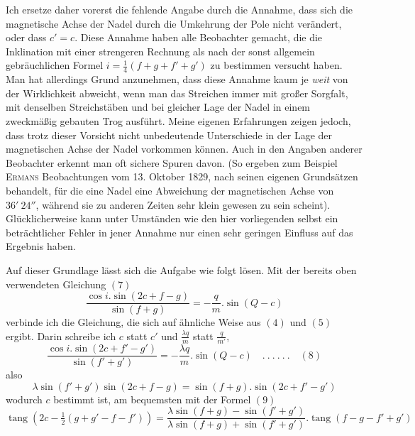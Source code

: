 Ich ersetze daher vorerst die fehlende Angabe durch die Annahme, dass sich die magnetische Achse der Nadel durch die Umkehrung der Pole nicht verändert, oder dass $c'=c$. Diese Annahme haben alle Beobachter gemacht, die die Inklination mit einer strengeren Rechnung als nach der sonst allgemein gebräuchlichen Formel $i=\frac14(f+g+f'+g')$ zu bestimmen versucht
haben. Man hat allerdings Grund anzunehmen, dass diese Annahme kaum je \textit{weit} von der Wirklichkeit abweicht, wenn man das Streichen immer mit großer Sorgfalt, mit denselben Streichstäben und bei gleicher Lage der Nadel in einem zweckmäßig gebauten Trog ausführt. Meine eigenen Erfahrungen zeigen jedoch, dass trotz dieser Vorsicht nicht unbedeutende Unterschiede in der Lage der magnetischen Achse der Nadel vorkommen können. Auch in den Angaben anderer Beobachter erkennt man oft sichere Spuren davon. (So ergeben zum Beispiel \textsc{Ermans} Beobachtungen vom 13. Oktober 1829, nach seinen eigenen Grundsätzen behandelt, für die eine Nadel eine Abweichung der magnetischen Achse von $36'\ 24''$, während sie zu anderen Zeiten sehr klein gewesen zu sein scheint). Glücklicherweise kann unter Umständen wie den hier vorliegenden selbst ein beträchtlicher Fehler in jener Annahme nur einen sehr geringen Einfluss auf das Ergebnis haben.

Auf dieser Grundlage lässt sich die Aufgabe wie folgt lösen. Mit der bereits oben verwendeten Gleichung $(7)$
\[
\frac{\cos i.\sin(2c+f-g)}{\sin(f+g)}=-\frac{q}{m}.\sin(Q-c)
\]
verbinde ich die Gleichung, die sich auf ähnliche Weise aus $(4)$ und $(5)$ ergibt. Darin schreibe ich $c$ statt $c'$ und $\frac{\lambda q}{m}$ statt $\frac{q}{m'}$,
\[
\frac{\cos i.\sin(2c+f'-g')}{\sin(f'+g')}=-\frac{\lambda q}{m}.\sin(Q-c)\quad.\ .\ .\ .\ .\ .\quad(8)
\]
also
\[
\lambda\sin(f'+g')\sin(2c+f-g)=\sin(f+g).\sin(2c+f'-g')
\]
wodurch $c$ bestimmt ist, am bequemsten mit der Formel $(9)$
\[
\operatorname{tang}(2c-\tfrac12(g+g'-f-f'))=\frac{\lambda\sin(f+g)-\sin(f'+g')}{\lambda\sin(f+g)+\sin(f'+g')}.\operatorname{tang}(f-g-f'+g')
\]

